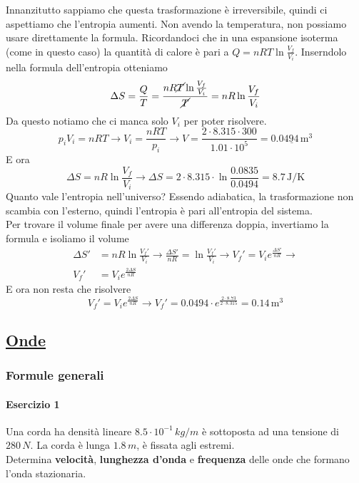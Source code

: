 Innanzitutto sappiamo che questa trasformazione è irreversibile, quindi ci aspettiamo che l'entropia
aumenti. Non avendo la temperatura, non possiamo usare direttamente la formula. Ricordandoci che in 
una espansione isoterma (come in questo caso) la quantità di calore è pari a 
$Q = nRT\ln\frac{V_f}{V_i}$. Inserndolo nella formula dell'entropia otteniamo
\begin{equation*}
  \Delta S = \frac{Q}{T} = \frac{nR\cancel{T}\ln\frac{V_f}{V_i}}{\cancel{T}} = nR\ln\frac{V_f}{V_i}
\end{equation*}
Da questo notiamo che ci manca solo $V_i$ per poter risolvere.
\begin{equation*}
  p_iV_i = nRT \rightarrow V_i = \frac{nRT}{p_i} \rightarrow V =
  \frac{2\cdot8.315\cdot300}{1.01\cdot10^5} = 
  \underline{0.0494\,\text{m}^3}
\end{equation*}
E ora
\begin{equation*}
  \Delta S = nR\ln\frac{V_f}{V_i} \rightarrow \Delta S = 2\cdot8.315\cdot\ln\frac{0.0835}{0.0494} =
  \boxed{8.7\,\text{J/K}}
\end{equation*}
Quanto vale l'entropia nell'universo? Essendo adiabatica, la trasformazione non scambia con l'esterno,
quindi l'entropia è pari all'entropia del sistema.\\
Per trovare il volume finale per avere una differenza doppia, invertiamo la formula e isoliamo il 
volume
\begin{align*}
  \Delta S' &= nR\ln\frac{V_f'}{V_i} \rightarrow \frac{\Delta S'}{nR} = \ln\frac{V_f'}{V_i} \rightarrow
  V_f' = V_ie^{\frac{\Delta S'}{nR}} \rightarrow\\ 
  V_f' &= V_ie^{\frac{2\Delta S}{nR}}
\end{align*}
E ora non resta che risolvere
\begin{equation*}
  V_f' = V_ie^{\frac{2\Delta S}{nR}} \rightarrow V_f' = 0.0494\cdot e^{\frac{2\cdot8.73}{2\cdot8.315}} =
  \boxed{0.14\,\text{m}^3}
\end{equation*}

\subsection*{\hyperref[sec:onde]{Onde}}\label{ex:onde}

\subsubsection*{Formule generali}
\paragraph{Esercizio 1}
Una corda ha densità lineare $8.5\cdot 10^{-1}\,kg/m$ è sottoposta ad una tensione di 
$280\,N$. La corda è lunga $1.8\,m$, è fissata agli estremi.\\
Determina \textbf{velocità}, \textbf{lunghezza d'onda} e \textbf{frequenza} delle onde che formano
l'onda stazionaria.
\divisor

